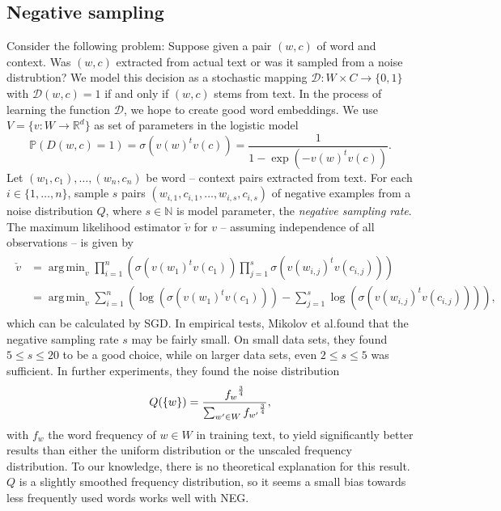 \documentclass{amsart}
\theoremstyle{plain}
\theoremstyle{definition}
\newcommand{\R}{\mathbb{R}}
\newcommand{\N}{\mathbb{N}}
\renewcommand{\P}{\mathbb{P}}
\DeclareMathOperator*{\argmin}{arg\,min}
\begin{document}
\subsection{Negative sampling}
Consider the following problem:
Suppose given a pair $(w, c)$ of word and context.
Was $(w, c)$ extracted from actual text or was it sampled from a noise distrubtion?
We model this decision as a stochastic mapping $\mathcal{D} : W \times C \rightarrow \{0, 1\}$ with $\mathcal{D}(w, c) = 1$ if and only if $(w, c)$ stems from text.
In the process of learning the function $\mathcal{D}$, we hope to create good word embeddings.
We use $V = \{v : W \rightarrow \R^d \}$ as set of parameters in the logistic model
\begin{equation}
  \P(D(w, c) = 1) = \sigma(v(w)^t v(c)) = \frac{1}{1 - \exp(-v(w)^t v(c))}.
\end{equation}
Let $(w_1, c_1), \dots, (w_n, c_n)$ be word -- context pairs extracted from text.
For each $i \in \{1, \dots, n\}$, sample $s$ pairs $(w_{i, 1}, c_{i, 1}, \dots, w_{i, s}, c_{i, s})$ of negative examples from a noise distribution $Q$, where $s \in \N$ is model parameter, the \emph{negative sampling rate}.
The maximum likelihood estimator $\check v$ for $v$ -- assuming independence of all observations -- is given by
\begin{align}
  \label{eq:ns-estimator}
  \begin{split}
    \check v & = \argmin_v \prod_{i=1}^n \left( \sigma(v(w_1)^t v(c_1)) \prod_{j = 1}^s \sigma(v(w_{i, j})^t v(c_{i, j})) \right) \\
             & = \argmin_v \sum_{i=1}^n \left( \log \left(\sigma(v(w_1)^t v(c_1)) \right) - \sum_{j = 1}^s \log \left( \sigma(v(w_{i, j})^t v(c_{i, j})) \right) \right),
  \end{split}
\end{align}
which can be calculated by SGD.
In empirical tests, Mikolov et al.\@ found that the negative sampling rate $s$ may be fairly small.
On small data sets, they found $5 \leq s \leq 20$ to be a good choice, while on larger data sets, even $2 \leq s \leq 5$ was sufficient.
In further experiments, they found the noise distribution
\begin{equation}
  \label{eq:noise-distribution}
  Q(\{w\}) = \frac{{f_w}^{3 \over 4}}{\sum_{w' \in W} {f_{w'}}^{3 \over 4}},
\end{equation}
with $f_w$ the word frequency of $w \in W$ in training text, to yield significantly better results than either the uniform distribution or the unscaled frequency distribution.
To our knowledge, there is no theoretical explanation for this result.
$Q$ is a slightly smoothed frequency distribution, so it seems a small bias towards less frequently used words works well with NEG.
\end{document}
